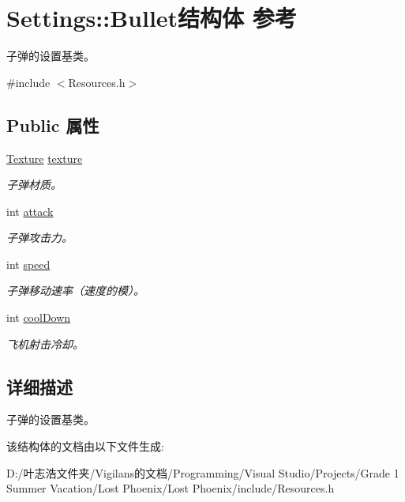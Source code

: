 \hypertarget{struct_settings_1_1_bullet}{}\section{Settings\+:\+:Bullet结构体 参考}
\label{struct_settings_1_1_bullet}


子弹的设置基类。  




{\ttfamily \#include $<$Resources.\+h$>$}

\subsection*{Public 属性}
\begin{DoxyCompactItemize}
\item 
\mbox{\label{struct_settings_1_1_bullet_a274a4b14c0bfaa540c5e60c273567bbd}} 
\hyperlink{struct_texture}{Texture} \hyperlink{struct_settings_1_1_bullet_a274a4b14c0bfaa540c5e60c273567bbd}{texture}
\begin{DoxyCompactList}\small\item\em 子弹材质。 \end{DoxyCompactList}\item 
\mbox{\label{struct_settings_1_1_bullet_a21e484cc6e290496e36a68da5b1a7b76}} 
int \hyperlink{struct_settings_1_1_bullet_a21e484cc6e290496e36a68da5b1a7b76}{attack}
\begin{DoxyCompactList}\small\item\em 子弹攻击力。 \end{DoxyCompactList}\item 
\mbox{\label{struct_settings_1_1_bullet_a8969e02d4dba2f87284855e0a141f6f3}} 
int \hyperlink{struct_settings_1_1_bullet_a8969e02d4dba2f87284855e0a141f6f3}{speed}
\begin{DoxyCompactList}\small\item\em 子弹移动速率（速度的模）。 \end{DoxyCompactList}\item 
\mbox{\label{struct_settings_1_1_bullet_a00faad5dff02426e73ab0326057b66ed}} 
int \hyperlink{struct_settings_1_1_bullet_a00faad5dff02426e73ab0326057b66ed}{cool\+Down}
\begin{DoxyCompactList}\small\item\em 飞机射击冷却。 \end{DoxyCompactList}\end{DoxyCompactItemize}


\subsection{详细描述}
子弹的设置基类。 



该结构体的文档由以下文件生成\+:\begin{DoxyCompactItemize}
\item 
D\+:/叶志浩文件夹/\+Vigilans的文档/\+Programming/\+Visual Studio/\+Projects/\+Grade 1 Summer Vacation/\+Lost Phoenix/\+Lost Phoenix/include/Resources.\+h\end{DoxyCompactItemize}

